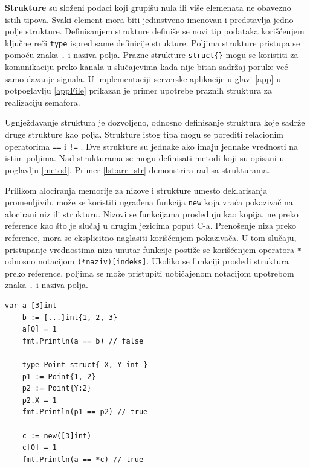\documentclass[12pt,oneside]{memoir}
\begin{document}
\textbf{Strukture} su složeni podaci koji grupišu nula ili više elemenata ne obavezno istih tipova. Svaki element mora biti jedinstveno imenovan i predstavlja jedno polje strukture. Definisanjem strukture definiše se novi tip podataka korišćenjem ključne reči \texttt{type} ispred same definicije strukture. Poljima strukture pristupa se pomoću znaka \texttt{.} i naziva polja. Prazne strukture \texttt{struct\{\}} mogu se koristiti za komunikaciju preko kanala u slučajevima kada nije bitan sadržaj poruke već samo davanje signala. U implementaciji serverske aplikacije u glavi \ref{app} u potpoglavlju \ref{appFile} prikazan je primer upotrebe praznih struktura za realizaciju semafora. 

Ugnježdavanje struktura je dozvoljeno, odnosno definisanje struktura koje sadrže druge strukture kao polja. Strukture istog tipa mogu se porediti relacionim operatorima   \texttt{==} i \texttt{!=} . Dve strukture su jednake ako imaju jednake vrednosti na istim poljima. Nad strukturama se mogu definisati metodi koji su opisani u poglavlju \ref{metod}. Primer \ref{lst:arr_str} demonstrira rad sa strukturama.

Prilikom alociranja memorije za nizove i strukture umesto deklarisanja promenljivih, može se koristiti ugrađena funkcija \texttt{new} koja vraća pokazivač na alocirani niz ili strukturu. Nizovi se funkcijama prosleđuju kao kopija, ne preko reference kao što je slučaj u drugim jezicima poput C-a. Prenošenje niza preko reference, mora se eksplicitno naglasiti korišćenjem pokazivača. U tom slučaju, pristupanje vrednostima niza unutar funkcije postiže se korišćenjem operatora \texttt{*} odnosno notacijom \texttt{(*naziv)[indeks]}. Ukoliko se funkciji prosledi struktura preko reference, poljima se može pristupiti uobičajenom notacijom upotrebom znaka \texttt{.} i naziva polja.
\newpage

\begin{center}
\begin{lstlisting}[caption=Rad sa nizovima i strukturama, label={lst:arr_str},  backgroundcolor=\color{background}]
	var a [3]int
	b := [...]int{1, 2, 3}
	a[0] = 1
	fmt.Println(a == b) // false

	type Point struct{ X, Y int }
	p1 := Point{1, 2}
	p2 := Point{Y:2}
	p2.X = 1
	fmt.Println(p1 == p2) // true

	c := new([3]int)
	c[0] = 1
	fmt.Println(a == *c) // true			
\end{lstlisting}
\end{center}
\end{document}
